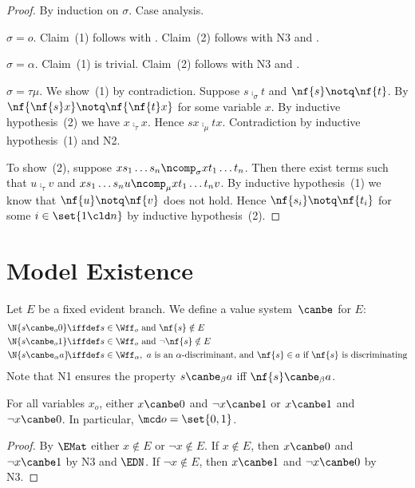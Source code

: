 \begin{proof}
  By induction on $\sigma$.  Case analysis.

  $\sigma=o$.  Claim~(1) follows with \EBE.
  Claim~(2) follows with N3 and \EMat.

  $\sigma=\alpha$.  Claim~(1) is trivial.  Claim~(2)
  follows with N3 and \EDec.

  $\sigma=\tau\mu$.  We show~(1) by contradiction.
  Suppose $s\comp_\sigma t$ and $\nf{s}\notq\nf{t}$.
  By \EFE $\nf{\nf{s}x}\notq\nf{\nf{t}x}$ for some
  variable $x$.  By inductive hypothesis~(2) we have
  $x\comp_\tau x$.  Hence $sx\comp_\mu tx$.
  Contradiction by inductive hypothesis~(1) and N2.

  To show~(2), suppose $xs_1\dots s_n\ncomp_\sigma
  xt_1\dots t_n$.  Then there exist terms such that
  $u\comp_\tau v$ and $xs_1\dots s_nu\ncomp_\mu
  xt_1\dots t_nv$.  By inductive hypothesis~(1) we know
  that $\nf{u}\notq\nf{v}$ does not hold.  Hence
  $\nf{s_i}\notq\nf{t_i}$ for some $i\in\set{1\cld n}$
  by inductive hypothesis~(2).
\end{proof}



\section{Model Existence}
\label{sec:model-existence}

Let $E$ be a fixed evident branch.  We define a value
system~$\canbe$ for $E$:
\begin{align*}
  \N{s \canbe_o 0}&\iffdef s\in\Wff_o \text{ and } \nf{s}\notin E\\
  \N{s \canbe_o 1}&\iffdef s\in\Wff_o \text{ and } \neg\nf{s}\notin E\\
  \N{s\canbe_\alpha a}\!&\iffdef 
  s\in\Wff_\alpha,~a \text{ is an $\alpha$-discriminant, and } 
  \nf{s}\in a \text{ if } \nf{s} \text{ is discriminating}
\end{align*}
Note that N1 ensures the property $s\canbe_\beta a$ iff
$\nf{s}\canbe_\beta a$.

\begin{prop}
  \label{prop-mod-ex-o}
  For all variables $x_o$, either $x\canbe 0$ and $\neg x\canbe 1$
  or $x\canbe 1$ and $\neg x\canbe 0$.
  In particular, $\mcd o=\set{0,1}$.
\end{prop}

\begin{proof}
  By $\EMat$ either $x\notin E$ or $\neg x\notin E$.
  If $x\notin E$, then $x\canbe 0$ and $\neg x\canbe 1$ by N3 and $\EDN$.
  If $\neg x\notin E$, then $x\canbe 1$ and $\neg x\canbe 0$ by N3.
\end{proof}

